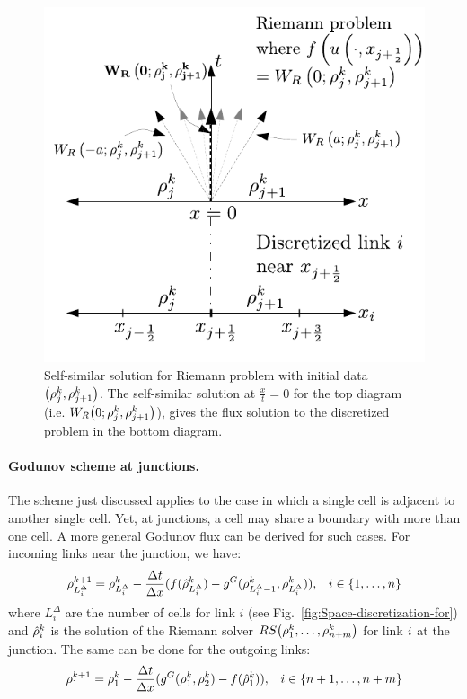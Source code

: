 \begin{figure}
\begin{centering}
\includegraphics[width=0.5\columnwidth]{previous-articles/adjoint/figs-gen/dx-to-riemann}
\par\end{centering}

\caption{Self-similar solution for Riemann problem with initial data $\left(\discrete{\xind}{\tind},\discrete{\xind+1}{\tind}\right)$.
The self-similar solution at $\frac{x}{t}=0$ for the top diagram
(i.e. $\ss 0{\discrete{\xind}{\tind}}{\discrete{\xind+1}{\tind}}$),
gives the flux solution to the discretized problem in the bottom diagram.\label{fig:Self-similar-solution-for}}
\end{figure}



\paragraph{Godunov scheme at junctions.\label{par:Godunov-scheme-at}}

The scheme just discussed applies to the case in which a single cell
is adjacent to another single cell. Yet, at junctions, a cell may
share a boundary with more than one cell. A more general Godunov flux
can be derived for such cases. For incoming links near the junction,
we have: 
\begin{align*}
\discrete{\length_{\link}^{\Delta}}{\tind+1}=\discrete{\length_{\link}^{\Delta}}{\tind}-\dfrac{\Delta t}{\Delta x}(f(\trace{\dvar}_{\length_{\link}^{\Delta}}^{\tind})-\god(\discrete{L_{i}^{\Delta}-1}{\tind},\discrete{L_{i}^{\Delta}}{\tind})), &  & \link\in\left\{ 1,\ldots,\ninc\right\} 
\end{align*}
where $L_i^{\Delta}$ are the number of cells for link $i$ (see Fig.~\ref{fig:Space-discretization-for}) and $\hat{\rho}_{i}^{k}$ is the solution of the Riemann solver
$\RS\tuple{\discrete 1{\tind}}{\discrete{\ninc+\nout}{\tind}}$ for
link $i$ at the junction. The same can be done for the outgoing
links: 
\begin{align*}
\discrete 1{\tind+1}=\discrete 1{\tind}-\dfrac{\Delta t}{\Delta x}(\god(\discrete 1{\tind},\discrete 2{\tind})-f(\trace{\dvar}_{1}^{\tind})), &  & \link\in\left\{ \ninc+1,\ldots,\ninc+\nout\right\} 
\end{align*}

